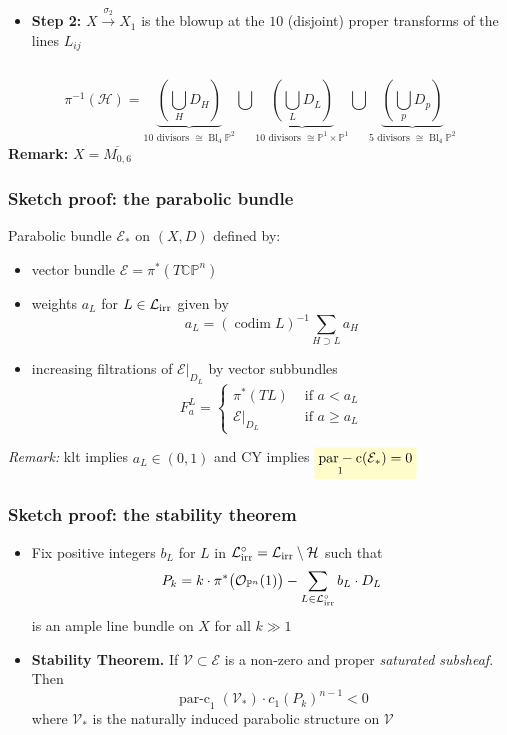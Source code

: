 \documentclass{beamer}
\renewcommand{\P}{\mathbb{P}}
\newcommand{\CP}{\mathbb{CP}}
\newcommand{\mE}{\mathcal{E}}
\newcommand{\mO}{\mathcal{O}}
\newcommand{\mH}{\mathcal{H}}
\newcommand{\mV}{\mathcal{V}}
\newcommand{\mLi}{\mathcal{L}_{\textup{irr}}}
\DeclareMathOperator{\codim}{codim}
\DeclareMathOperator{\parc}{par-c}
\DeclareMathOperator{\Bl}{Bl}
\newcommand{\mathcolorbox}[2]{\colorbox{#1}{$\displaystyle #2$}}
\begin{document}
\begin{frame}
\begin{columns}
\begin{column}{.68\textwidth}
\begin{itemize}
				\item \textbf{Step 2:} \(X \xrightarrow{\sigma_2} X_1\) is the blowup at the \(10\) (disjoint) proper transforms of the  lines \(L_{ij}\)
			\end{itemize}
		\end{column}
	\end{columns}
	
\footnotesize{
	\begin{equation*}	
		\pi^{-1}(\mH) = \underbrace{\left( \bigcup_{H} D_H \right)}_{10 \text{ divisors } \cong \Bl_4 \P^2} \bigcup \underbrace{\left( \bigcup_{L} D_L \right)}_{10 \text{ divisors } \cong \P^1 \times \P^1} \bigcup \underbrace{\left( \bigcup_{p} D_p \right)}_{5 \text{ divisors } \cong \Bl_4 \P^2} 
	\end{equation*}
}	
\vfill
\normalsize	
\textbf{Remark:} \(X = \overline{M_{0,6}}\)

\end{frame}

\begin{frame}
	\frametitle{Sketch proof: the parabolic bundle}
	Parabolic bundle \(\mE_{*}\) on \((X,D)\) defined by:
	\begin{itemize}
		\item vector bundle \(\mE = \pi^*(T\CP^n)\)
		\item weights \(a_L\) for \(L \in \mLi\) given by
		\[
		a_L = (\codim L)^{-1} \sum_{H \supset L} a_H 
		\]
		\item increasing filtrations of \(\mE|_{D_L}\) by vector subbundles 
		\begin{equation*}
		F^L_a = 
		\begin{cases}
		\pi^*(TL) &\text{ if } a < a_L \\
		\mE|_{D_L} &\text{ if } a \geq a_L 
		\end{cases}
		\end{equation*}	
	\end{itemize}
\emph{Remark:} klt implies \(a_L \in (0,1)\) and 
CY implies \(\mathcolorbox{yellow!20}{\parc_1(\mE_{*}) = 0}\)
\end{frame}


\begin{frame}
	\frametitle{Sketch proof: the stability theorem}
	\begin{itemize}
		\item Fix positive integers \(b_L\) for \(L\) in \( \mLi^{\circ} = \mLi \setminus \mH\) such  that
		\begin{equation*}
		P_k = k \cdot \pi^*\big(\mO_{\P^n}(1)\big) - \sum_{L \in \mLi^{\circ}} b_L \cdot D_L
		\end{equation*}
		is an ample line bundle on \(X\) for all \(k \gg 1\)
		\vfill
		
		\item \textbf{Stability Theorem.}
		If \(\mV \subset \mE\) is a non-zero and proper \emph{saturated subsheaf}. Then
		\[
		\parc_{1}(\mV_{*}) \cdot c_1(P_k)^{n-1} < 0 
		\]
		where \(\mV_{*}\) is the naturally induced parabolic structure on \(\mV\)
	\end{itemize}
\end{frame}
\end{document}
